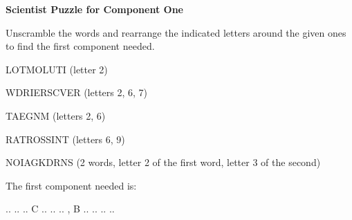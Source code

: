 \documentclass[white]{guildcamp3}
\begin{document}
\name{\wSciPuzzleOne{}} %

\large\textbf{Scientist Puzzle for Component One}

Unscramble the words and rearrange the indicated letters around the given ones to find the first component needed.   

LOTMOLUTI (letter 2)

WDRIERSCVER (letters 2, 6, 7)

TAEGNM (letters 2, 6)

RATROSSINT (letters 6, 9)

NOIAGKDRNS (2 words, letter 2 of the first word, letter 3 of the second)

The first component needed is: 

.. .. .. C .. .. .. , B .. .. .. ..


\end{document}
